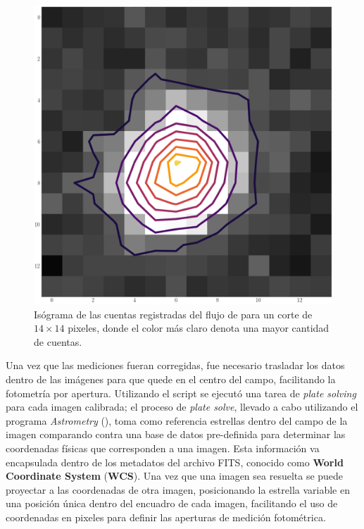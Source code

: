 \begin{figure}[!ht]
	\centering
	\includegraphics[scale=0.4]{Observaciones/Secciones/Figures/Figura Pixel Perfil Contorno.png}
	\caption{Isógrama de las cuentas registradas del flujo de \atoObjId para un
	corte de $14 \times 14$ pixeles, donde el color más claro denota una mayor
	cantidad de cuentas.}
	\label{figuraPixelContorno}
\end{figure}

Una vez que las mediciones fueran corregidas, fue necesario trasladar los datos
dentro de las imágenes para que \atoObjId quede en el centro del campo,
facilitando la fotometría por apertura. Utilizando el script
\href{https://github.com/KnightIV/UANL_MAPTA_Observaciones/blob/main/analisis/iturbide/shift_images.py}{}
se ejecutó una tarea de \textit{plate solving} para cada imagen calibrada; el
proceso de \textit{plate solve}, llevado a cabo utilizando el programa
\textit{Astrometry} (), toma como referencia estrellas
dentro del campo de la imagen comparando contra una base de datos pre-definida
para determinar las coordenadas físicas que corresponden a una imagen. Esta
información va encapsulada dentro de los metadatos del archivo FITS, conocido
como \textbf{World Coordinate System} (\textbf{WCS}). Una vez que una imagen sea
resuelta se puede proyectar a las coordenadas de otra imagen, posicionando la
estrella variable en una posición única dentro del encuadro de cada imagen,
facilitando el uso de coordenadas en pixeles para definir las aperturas de
medición fotométrica.


